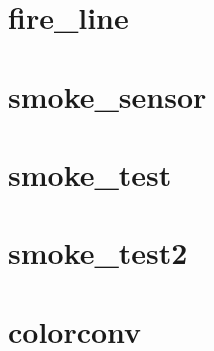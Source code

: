 \documentclass[11pt,twoside]{book}
\newcommand{\fdsinput}[1]{
{
\scriptsize

}
}
\begin{document}
\section{fire\_line}
\label{SSFfireline}
\fdsinput{fire_line.ssf}

\section{smoke\_sensor}
\label{SSFsmokesensor}
\fdsinput{smoke_sensor.ssf}

\section{smoke\_test}
\label{SSFsmoketest}
\fdsinput{smoke_test.ssf}

\section{smoke\_test2}
\label{SSFsmoketest2}
\fdsinput{smoke_test2.ssf}

\section{colorconv}
\label{SSFcolorconv}
\fdsinput{colorconv.ssf}
\end{document}
